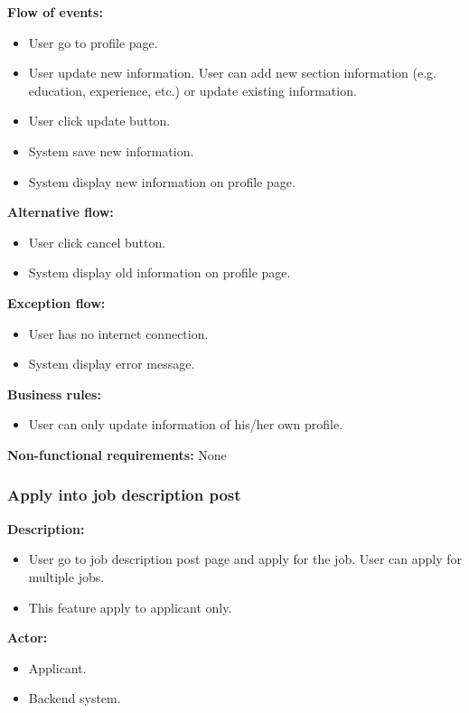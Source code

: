 \documentclass[a4paper]{article}
\begin{document}
\textbf{Flow of events:}
\begin{itemize}
    \item User go to profile page.
    \item User update new information. User can add new section information (e.g. education, experience, etc.) or update existing information.
    \item User click update button.
    \item System save new information.
    \item System display new information on profile page.
\end{itemize}

\textbf{Alternative flow:}
\begin{itemize}
    \item User click cancel button.
    \item System display old information on profile page.
\end{itemize}

\textbf{Exception flow:}
\begin{itemize}
    \item User has no internet connection.
    \item System display error message.
\end{itemize}

\textbf{Business rules:}
\begin{itemize}
    \item User can only update information of his/her own profile.
\end{itemize}

\textbf{Non-functional requirements:}
None

\subsubsection{Apply into job description post}
\textbf{Description:}
\begin{itemize}
    \item User go to job description post page and apply for the job. User can apply for multiple jobs.
    \item This feature apply to applicant only.
\end{itemize}

\textbf{Actor:}
\begin{itemize}
    \item Applicant.
    \item Backend system.
\end{itemize}
\end{document}
